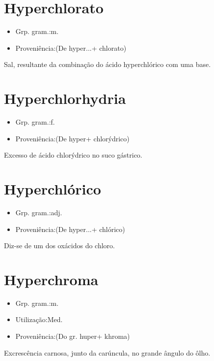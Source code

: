 \documentclass{article}
\begin{document}
\section{Hyperchlorato}
\begin{itemize}
\item {Grp. gram.:m.}
\end{itemize}
\begin{itemize}
\item {Proveniência:(De \textunderscore hyper...\textunderscore  + \textunderscore chlorato\textunderscore )}
\end{itemize}
Sal, resultante da combinação do ácido hyperchlórico com uma base.
\section{Hyperchlorhydria}
\begin{itemize}
\item {Grp. gram.:f.}
\end{itemize}
\begin{itemize}
\item {Proveniência:(De \textunderscore hyper\textunderscore  + \textunderscore chlorýdrico\textunderscore )}
\end{itemize}
Excesso de ácido chlorýdrico no suco gástrico.
\section{Hyperchlórico}
\begin{itemize}
\item {Grp. gram.:adj.}
\end{itemize}
\begin{itemize}
\item {Proveniência:(De \textunderscore hyper...\textunderscore  + \textunderscore chlórico\textunderscore )}
\end{itemize}
Diz-se de um dos oxácidos do chloro.
\section{Hyperchroma}
\begin{itemize}
\item {Grp. gram.:m.}
\end{itemize}
\begin{itemize}
\item {Utilização:Med.}
\end{itemize}
\begin{itemize}
\item {Proveniência:(Do gr. \textunderscore huper\textunderscore  + \textunderscore khroma\textunderscore )}
\end{itemize}
Excrescência carnosa, junto da carúncula, no grande ângulo do ôlho.
\end{document}
